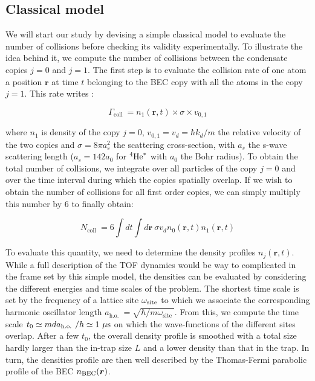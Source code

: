 \subsection{Classical model}

We will start our study by devising a simple classical model to evaluate the number of collisions before checking its validity experimentally. To illustrate the idea behind it, we compute the number of collisions between the condensate copies $j=0$ and $j=1$. The first step is to evaluate the collision rate of one atom a position $\bm{r}$ at time $t$ belonging to the BEC copy with all the atoms in the copy $j=1$. This rate writes \cite{chikkatur2000suppression,perrin:tel-00244641}:

\begin{equation}
    \Gamma_{\text {coll }}=n_{1}(\bm{r}, t) \times \sigma \times v_{0,1}
\end{equation}

\noindent where $n_1$ is density of the copy $j=0$, $v_{0,1}=v_d=\hbar k_d/m$ the relative velocity of the two copies and $\sigma= 8 \pi a_s^2$ the scattering cross-section, with $a_s$ the s-wave scattering length ($a_s = 142 a_0$ for $^4\mathrm{He}^*$ with $a_0$ the Bohr radius). To obtain the total number of collisions, we integrate over all particles of the copy $j=0$ and over the time interval during which the copies spatially overlap. If we wish to obtain the number of collisions for all first order copies, we can simply multiply this number by $6$ to finally obtain:

\begin{equation}
    N_{\text {coll }}=6 \int d t \int d \bm{r} \ \sigma v_{d} n_{0}(\bm{r}, t) n_{1}(\bm{r}, t)
    \label{eq:coll_model_general}
\end{equation}

To evaluate this quantity, we need to determine the density profiles $n_{j}(\bm{r}, t)$. While a full description of the TOF dynamics would be way to complicated in the frame set by this simple model, the densities can be evaluated by considering the different energies and time scales of the problem. The shortest time scale is set by the frequency of a lattice site $\omega_{\rm{site}}$ to which we associate the corresponding harmonic oscillator length $a_{\text {h.o. }}=\sqrt{\hbar / m \omega_{\text {site }}}$. From this, we compute the time scale $t_0 \simeq m d a_{\text {h.o. }} /h \simeq 1 \ \mu \rm{s}$ on which the wave-functions of the different sites overlap. After a few $t_0$, the overall density profile is smoothed with a total size hardly larger than the in-trap size $L$ and a lower density than that in the trap. In turn, the densities profile are then well described by the Thomas-Fermi parabolic profile of the BEC $n_{\rm{BEC}}(\bm{r})$.

